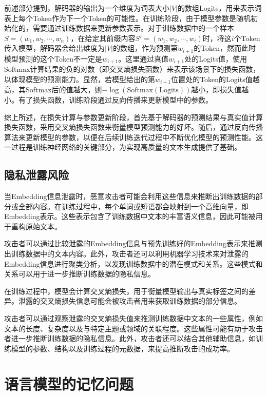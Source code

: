 前述部分提到，解码器的输出为一个维度为词表大小$|V|$的数组Logits，用来表示词表上每个Token作为下一个Token的可能性。在训练阶段，由于模型参数是随机初始化的，需要通过训练数据来更新参数表示。对于训练数据中的一个样本$S=(w_1,w_2,\cdots,w_n)$，在给定其前缀内容$S'=(w_1,w_2,\cdots,w_i)$时，将这$i$个Token传入模型，解码器会给出维度为$|V|$的数组，作为预测第$w_{i+1}$的Token，然而此时模型预测的这个Token不一定是$w_{i+1}$。这里通过真值$w_{i+1}$处的Logits值，使用Softmax计算结果的负的对数（即交叉熵损失函数）来表示该场景下的损失函数，以体现模型的预测能力。显然，若模型给出的第$w_{i+1}$位置处的Token的Logits值越高，其Softmax后的值越大，则$-\log (\text{Softmax}(\text{Logits}))$越小，即损失值越小。有了损失函数，训练阶段通过反向传播来更新模型中的参数。

综上所述，在损失计算与参数更新阶段，首先基于解码器的预测结果与真实值计算损失函数，采用交叉熵损失函数来衡量模型预测能力的好坏。随后，通过反向传播算法来更新模型的参数，以便在后续训练迭代过程中不断优化模型的预测性能。这一过程是训练神经网络的关键部分，为实现高质量的文本生成提供了基础。

\subsection{隐私泄露风险}

当Embedding信息泄露时，恶意攻击者可能会利用这些信息来推断出训练数据的部分或全部内容。在训练过程中，每个单词或短语都会映射到一个高维向量，即Embedding表示。这些表示包含了训练数据中文本的丰富语义信息，因此可能被用于重构原始文本。

攻击者可以通过比较泄露的Embedding信息与预先训练好的Embedding表示来推测出训练数据中的文本内容。此外，攻击者还可以利用机器学习技术来对泄露的Embedding信息进行聚类分析，以发现训练数据中的潜在模式和关系。这些模式和关系可以用于进一步推断训练数据的隐私信息。

在训练过程中，模型会计算交叉熵损失，用于衡量模型输出与真实标签之间的差异。泄露的交叉熵损失信息可能会被攻击者用来获取训练数据的部分信息。

攻击者可以通过观察泄露的交叉熵损失值来推测训练数据中文本的一些属性，例如文本的长度、复杂度以及与特定主题或领域的关联程度。这些属性可能有助于攻击者进一步推断训练数据的隐私信息。此外，攻击者还可以结合其他辅助信息，如训练模型的参数、结构以及训练过程的元数据，来提高推断攻击的成功率。

\section{语言模型的记忆问题}

